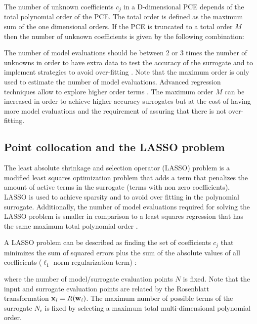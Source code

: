 \documentclass[preprint,12pt]{elsarticle}
\begin{document}
The number of unknown coefficients $c_j$ in a D-dimensional PCE depends of the total polynomial order of the PCE. The total order is defined as the maximum sum of the one dimensional orders. If the PCE is truncated to a total order $M$ then the number of unknown coefficients is given by the following combination:


The number of model evaluations should be between 2 or 3 times the number of unknowns in order to have extra data to test the accuracy of the surrogate and to implement strategies to avoid over-fitting \cite{blatman2011adaptive}. Note that the maximum order is only used to estimate the number of model evaluations. Advanced regression techniques allow to explore higher order terms \cite{tibshirani1996regression, blatman2011adaptive}. The maximum order $M$ can be increased in order to achieve higher accuracy surrogates but at the cost of having more model evaluations and the requirement of assuring that there is not over-fitting.

\subsection{Point collocation and the LASSO problem}
\label{sec_LASSO}

The least absolute shrinkage and selection operator (LASSO) problem is a modified least squares optimization problem that adds a term that penalizes the amount of active terms in the surrogate (terms with non zero coefficients). LASSO is used to achieve sparsity and to avoid over fitting in the polynomial surrogate. Additionally, the number of model evaluations required for solving the LASSO problem is smaller in comparison to a least squares regression that has the same maximum total polynomial order \cite{blatman2011adaptive}.

A LASSO problem can be described as finding the set of coefficients $c_j$ that minimizes the sum of squared errors plus the sum of the absolute values of all coefficients ($\ell_1$ norm regularization term) \cite{tibshirani1996regression}:



\noindent where the number of model/surrogate evaluation points $N$ is fixed. Note that the input and surrogate evaluation points are related by the Rosenblatt transformation $\mathbf{x}_i=R(\mathbf{w}_i)$. The maximum number of possible terms of the surrogate $N_c$ is fixed by selecting a maximum total multi-dimensional polynomial order.
\end{document}
